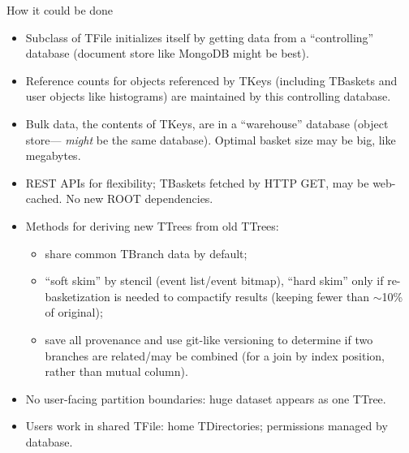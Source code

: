 \documentclass[aspectratio=169]{beamer}
\begin{document}
\begin{frame}{How it could be done}
\vspace{0.3 cm}
\begin{itemize}
\item<1-> Subclass of TFile initializes itself by getting data from a ``controlling'' database (document store like MongoDB might be best).
\item<2-> Reference counts for objects referenced by TKeys (including TBaskets and user objects like histograms) are maintained by this controlling database.
\item<3-> Bulk data, the contents of TKeys, are in a ``warehouse'' database (object store--- \mbox{\it might} be the same database). Optimal basket size may be big, like megabytes.
\item<4-> REST APIs for flexibility; TBaskets fetched by HTTP GET, may be web-cached. No new ROOT dependencies.
\item<5-> Methods for deriving new TTrees from old TTrees:
\begin{itemize}
\item<5-> share common TBranch data by default;
\item<6-> ``soft skim'' by stencil (event list/event bitmap), ``hard skim'' only if re-basketization is needed to compactify results (keeping fewer than $\sim$10\% of original);
\item<7-> save all provenance and use git-like versioning to determine if two branches are related/may be combined (for a join by index position, rather than mutual column).
\end{itemize}
\item<8-> No user-facing partition boundaries: huge dataset appears as one TTree.
\item<9-> Users work in shared TFile: home TDirectories; permissions managed by database.
\end{itemize}
\end{frame}
\end{document}
